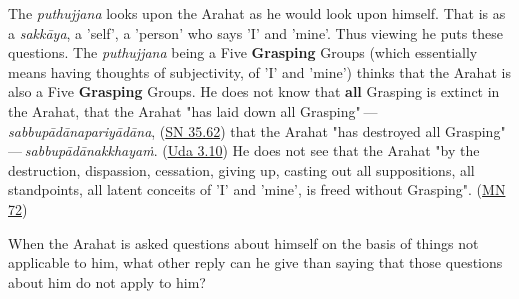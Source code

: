 The \emph{puthujjana} looks upon the Arahat as he would look upon himself.
That is as a \emph{sakkāya}, a 'self', a 'person' who says 'I' and 'mine'.
Thus viewing he puts these questions. The \emph{puthujjana} being a Five
\textbf{Grasping} Groups (which essentially means having thoughts of
subjectivity, of 'I' and 'mine') thinks that the Arahat is also a Five
\textbf{Grasping} Groups. He does not know that \textbf{all} Grasping is extinct in
the Arahat, that the Arahat "has laid down all Grasping" — \emph{sabbupādānapariyādāna}, (\href{https://suttacentral.net/sn35.62/en/bodhi}{SN 35.62}) that the Arahat "has destroyed
all Grasping" — \emph{sabbupādānakkhayaṁ}. (\href{https://suttacentral.net/ud3.10/en/anandajoti}{Uda 3.10})
He does not see that the Arahat "by the destruction,
dispassion, cessation, giving up, casting out all suppositions, all
standpoints, all latent conceits of 'I' and 'mine', is freed without
Grasping". (\href{https://suttacentral.net/mn72/en/thanissaro}{MN 72})


When the Arahat is asked questions about himself on the basis of things not
applicable to him, what other reply can he give than saying that those questions
about him do not apply to him?


